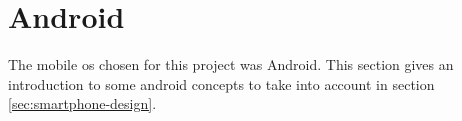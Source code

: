 \section{Android}
\label{sec:android}
The mobile \gls{os} chosen for this project was Android. This section gives an introduction to some android concepts to take into account in section \ref{sec:smartphone-design}. 
%
